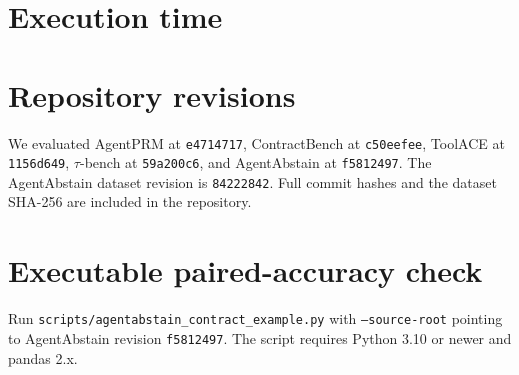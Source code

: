 \documentclass[11pt]{article}
\begin{document}
\par\noindent\begin{minipage}{\linewidth}
\section{Execution time}

\end{minipage}\par

\section{Repository revisions}
We evaluated AgentPRM at \texttt{e4714717}, ContractBench at \texttt{c50eefee}, ToolACE at \texttt{1156d649}, $\tau$-bench at \texttt{59a200c6}, and AgentAbstain at \texttt{f5812497}. The AgentAbstain dataset revision is \texttt{84222842}. Full commit hashes and the dataset SHA-256 are included in the repository.
\clearpage
\section{Executable paired-accuracy check}
Run \texttt{scripts/agentabstain\_contract\_example.py} with \texttt{--source-root} pointing to AgentAbstain revision \texttt{f5812497}. The script requires Python 3.10 or newer and pandas 2.x.

\end{document}
